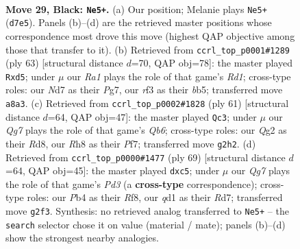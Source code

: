 \documentclass[11pt]{article}
\begin{document}
\clearpage

\begin{figure}[p]\centering
\begin{subfigure}{0.46\textwidth}\centering
\resizebox{\linewidth}{!}{%
\newchessgame
\chessboard[
  setfen={r6r/3nk2p/1pp1p1p1/8/1p1P3P/P2KPRb1/RP4q1/2BQ4 b - - 1 29},
  showmover=false,
  pgfstyle=straightmove, color=movearrow, markmove={d7-e5}
]}
\caption{}
\end{subfigure}\hfill
\begin{subfigure}{0.46\textwidth}\centering
\resizebox{\linewidth}{!}{%
\newchessgame
\chessboard[
  setfen={1r1r2k1/5pp1/4p3/pBqPn1P1/P2R3P/7R/2P2P2/2KQ4 b - - 2 32},
  showmover=false,
  pgfstyle=straightmove, color=movearrow, markmove={d8-d5}
]}
\caption{}
\end{subfigure}
\\[4pt]
\begin{subfigure}{0.46\textwidth}\centering
\resizebox{\linewidth}{!}{%
\newchessgame
\chessboard[
  setfen={2rr2k1/1n3pp1/p6p/4p3/1pP1P3/1q1PB2P/4QPP1/1R1R2K1 b - - 1 31},
  showmover=false,
  pgfstyle=straightmove, color=movearrow, markmove={b3-c3}
]}
\caption{}
\end{subfigure}\hfill
\begin{subfigure}{0.46\textwidth}\centering
\resizebox{\linewidth}{!}{%
\newchessgame
\chessboard[
  setfen={5rk1/1q1r2pp/3p4/2R1pP2/p3P1P1/P2b3P/1B1R2BK/4Q3 b - - 0 35},
  showmover=false,
  pgfstyle=straightmove, color=movearrow, markmove={d6-c5}
]}
\caption{}
\end{subfigure}
\caption{\textbf{Move 29, Black: \texttt{Ne5+}.} (a) Our position; Melanie plays \texttt{Ne5+} (\texttt{d7e5}). Panels (b)--(d) are the retrieved master positions whose correspondence most drove this move (highest QAP objective among those that transfer to it). (b) Retrieved from \texttt{ccrl\_top\_p0001\#1289} (ply 63) [structural distance $d$=70, QAP obj=78]: the master played \texttt{Rxd5}; under $\mu$ our \emph{Ra1} plays the role of that game's \emph{Rd1}; cross-type roles: our \emph{N}d7 as their \emph{P}g7, our \emph{r}f3 as their \emph{b}b5; transferred move \texttt{a8a3}. (c) Retrieved from \texttt{ccrl\_top\_p0002\#1828} (ply 61) [structural distance $d$=64, QAP obj=47]: the master played \texttt{Qc3}; under $\mu$ our \emph{Qg7} plays the role of that game's \emph{Qb6}; cross-type roles: our \emph{Q}g2 as their \emph{R}d8, our \emph{R}h8 as their \emph{P}f7; transferred move \texttt{g2h2}. (d) Retrieved from \texttt{ccrl\_top\_p0000\#1477} (ply 69) [structural distance $d$=64, QAP obj=45]: the master played \texttt{dxc5}; under $\mu$ our \emph{Qg7} plays the role of that game's \emph{Pd3} (a \textbf{cross-type} correspondence); cross-type roles: our \emph{P}b4 as their \emph{R}f8, our \emph{q}d1 as their \emph{R}d7; transferred move \texttt{g2f3}. Synthesis: no retrieved analog transferred to \texttt{Ne5+} -- the \texttt{search} selector chose it on value (material / mate); panels (b)--(d) show the strongest nearby analogies.}
\label{fig:thought-m57}
\end{figure}
\end{document}
